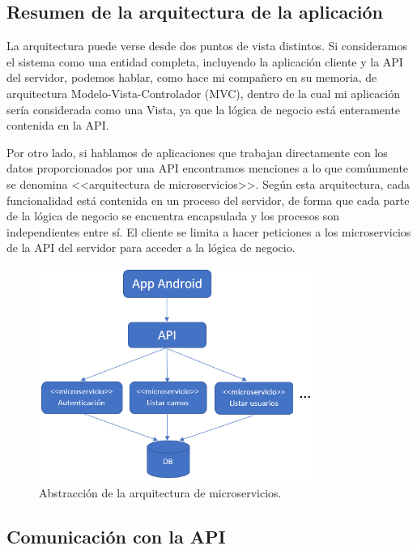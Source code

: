 \subsection{Resumen de la arquitectura de la aplicación}

La arquitectura puede verse desde dos puntos de vista distintos. Si consideramos el sistema como una entidad completa, incluyendo la aplicación cliente y la API del servidor, podemos hablar, como hace mi compañero en su memoria, de arquitectura Modelo-Vista-Controlador (MVC), dentro de la cual mi aplicación sería considerada como una Vista, ya que la lógica de negocio está enteramente contenida en la API. 

Por otro lado, si hablamos de aplicaciones que trabajan directamente con los datos proporcionados por una API encontramos menciones a lo que comúnmente se denomina <<arquitectura de microservicios>>. Según esta arquitectura, cada funcionalidad está contenida en un proceso del servidor, de forma que cada parte de la lógica de negocio se encuentra encapsulada y los procesos son independientes entre sí. El cliente se limita a hacer peticiones a los microservicios de la API del servidor para acceder a la lógica de negocio. 

\begin{figure}[H]
	\centering
	\includegraphics[width=0.8\textwidth]{../img/microservicios.png}
	\caption{Abstracción de la arquitectura de microservicios.}
	\label{fig:microservicios}
\end{figure}

\subsection{Comunicación con la API}

